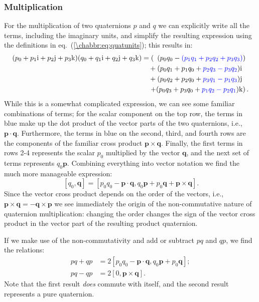 \subsubsection{Multiplication}
For the multiplication of two quaternions $p$ and $q$ we can explicitly write all the terms, including the imaginary units, and simplify the resulting expression using the definitions in eq.~(\ref{\chabbr:eq:quatunits}); this results in:
\begin{equation}
\begin{split}
	(p_0 + p_1\mathrm{i}+p_2\mathrm{j}+p_3\mathrm{k})(q_0 + q_1\mathrm{i}+q_2\mathrm{j}+q_3\mathrm{k}) &= \left(\,\,\,  (p_0q_0 - {\color{blue}(p_1q_1+ p_2q_2 + p_3q_3)}) \right.\\
&\quad+(p_0q_1 + p_1q_0 + {\color{blue}p_2q_3 - p_3q_2})\mathrm{i}\\ 
&\quad+(p_0q_2 + p_2q_0 + {\color{blue}p_3q_1 - p_1q_3})\mathrm{j}\\ 
&\quad\left.+(p_0q_3 + p_3q_0 + {\color{blue}p_1q_2 - p_2q_1})\mathrm{k} \right).
\end{split}\label{\chabbr:eq:qmult2}
\end{equation}
While this is a somewhat complicated expression, we can see some familiar combinations of terms; for the scalar component on the top row, the terms in blue make up the dot product of the vector parts of the two quaternions, i.e., $\mathbf{p}\cdot\mathbf{q}$. Furthermore, the terms in blue on the second, third, and fourth rows are the components of the familiar cross product $\mathbf{p}\times\mathbf{q}$.  Finally, the first terms in rows 2-4 represents the scalar $p_0$ multiplied by the vector $\mathbf{q}$, and the next set of terms represents $q_0\mathbf{p}$.  Combining everything into vector notation we find the much more manageable expression:
\begin{equation}
	[p_0,\mathbf{p}]\,[q_0,\mathbf{q}] = [ p_0q_0-\mathbf{p}\cdot\mathbf{q}, q_0\mathbf{p}+p_0\mathbf{q}+\mathbf{p}\times\mathbf{q} ].\label{\chabbr:eq:qmult}
\end{equation}
Since the vector cross product depends on the order of the vectors, i.e., $\mathbf{p}\times\mathbf{q}=-\mathbf{q}\times\mathbf{p}$ we see immediately the origin of the non-commutative nature of quaternion multiplication: changing the order changes the sign of the vector cross product in the vector part of the resulting product quaternion.

If we make use of the non-commutativity and add or subtract $pq$ and $qp$, we find the relations:
\begin{equation}
\begin{split}
	pq+qp &= 2[ p_0q_0-\mathbf{p}\cdot\mathbf{q}, q_0\mathbf{p}+p_0\mathbf{q}];\\
	pq-qp &= 2[0,\mathbf{p}\times\mathbf{q}].
\end{split}
\end{equation}
Note that the first result \textit{does} commute with itself, and the second result represents a pure quaternion.

